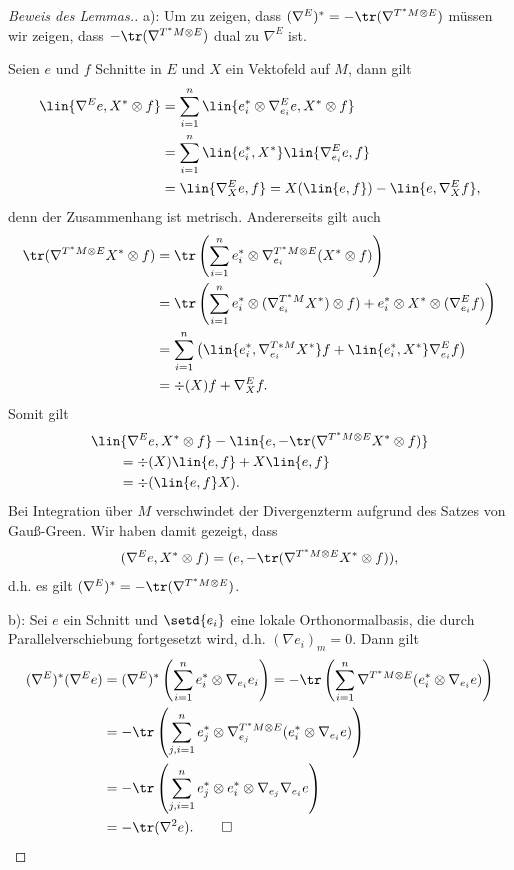 \documentclass[%
	paper=a5,%
	fleqn,%
	DIV=18,%
	BCOR=0mm,
	fontsize=11pt,
	titlepage=false,%
	bibliography=totoc,
	DIV=18,%
	twoside=true,
	pdftitle=Riemannsche Geometrie,
	pdfauthor=Uwe Semmelmann,
	numbers=noendperiod]%
	{scrbook}
\begin{document}
\begin{proof}[Beweis des Lemmas.]
a): Um zu zeigen, dass $(\nabla^E)^* = -\tr(\nabla^{T^*M\otimes E})$ müssen wir zeigen, dass $-\tr(\nabla^{T^*M\otimes E})$ dual zu $\nabla^E$ ist.

Seien $e$ und $f$ Schnitte in $E$ und $X$ ein Vektofeld auf $M$, dann gilt
\begin{align*}
\lin{\nabla^E e,X^*\otimes f} &= 
\sum_{i=1}^n \lin{e_{i}^*\otimes \nabla_{e_{i}}^E e, X^*\otimes f }\\
&=\sum_{i=1}^n \lin{e_{i}^*,X^*}\lin{\nabla_{e_{i}}^E e, f }\\
&= \lin{\nabla_{X}^E e,f}
= X(\lin{e,f}) - \lin{e,\nabla_{X}^E f},
\end{align*}
denn der Zusammenhang ist metrisch. Andererseits gilt auch
\begin{align*}
\tr(\nabla^{T^*M\otimes E}X^*\otimes f) &=
\tr\left( \sum_{i=1}^n e_{i}^* \otimes \nabla_{e_{i}}^{T^*M\otimes E} (X^*\otimes f) \right) \\
&=
\tr\left( \sum_{i=1}^n e_{i}^* \otimes (\nabla_{e_{i}}^{T^*M}X^*)\otimes f) + 
e_{i}^* \otimes X^*\otimes  (\nabla_{e_{i}}^{E}f) \right) \\
&=
\sum_{i=1}^n\left( \lin{e_{i}^*,\nabla_{e_{i}}^{T*M}X^*}f + 
\lin{e_{i}^*,X^*}\nabla_{e_{i}}^E f\right)\\
&= \div(X) f + \nabla_{X}^Ef.
\end{align*}
Somit gilt
\begin{align*}
&\lin{\nabla^E e,X^*\otimes f}  -
\lin{e,-\tr(\nabla^{T^*M\otimes E}X^*\otimes f)}\\
 &\qquad= 
\div(X)\lin{e,f} + X\lin{e,f} \\
&\qquad=  \div(\lin{e,f}X).
\end{align*}
Bei Integration über $M$ verschwindet der Divergenzterm aufgrund des Satzes von Gauß-Green. Wir haben damit gezeigt, dass
\begin{align*}
(\nabla^E e,X^*\otimes f) =  (e,-\tr(\nabla^{T^*M\otimes E}X^*\otimes f)),
\end{align*}
d.h. es gilt $(\nabla^E)^* = -\tr(\nabla^{T^*M\otimes E})$.

b): Sei $e$ ein Schnitt und $\setd{e_{i}}$ eine lokale Orthonormalbasis, die durch Parallelverschiebung fortgesetzt wird, d.h. $(\nabla e_{i})_{m} = 0$. Dann gilt
\begin{align*}
(\nabla^E)^*(\nabla^E e) &= (\nabla^E)^* \left(\sum_{i=1}^n e_{i}^* \otimes \nabla_{e_{i}} e_{i}\right)
= -\tr\left(\sum_{i=1}^n \nabla^{T^*M\otimes E} (e_{i}^* \otimes \nabla_{e_{i}}e) \right) \\
&= 
 -\tr\left(\sum_{j,i=1}^n e_{j}^*\otimes \nabla_{e_{j}}^{T^*M\otimes E} (e_{i}^* \otimes \nabla_{e_{i}}e)
 \right) \\
&= 
 -\tr\left(\sum_{j,i=1}^n e_{j}^*\otimes e_{i}^* \otimes \nabla_{e_{j}}\nabla_{e_{i}}e \right) \\
 &= - \tr(\nabla^2 e).\qed
\end{align*}
\end{proof}
\end{document}
